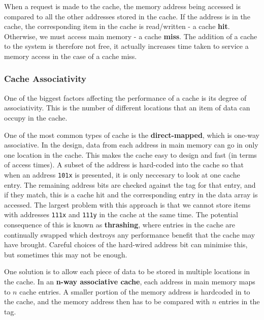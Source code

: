 \documentclass{article}
\begin{document}
	\par 
	When a request is made to the cache, the memory address being accessed is compared to all the other addresses stored in the cache. If the address is in the cache, the corresponding item in the cache is read/written - a cache \textbf{hit}. Otherwise, we must access main memory - a cache \textbf{miss}. The addition of a cache to the system is therefore not free, it actually increases time taken to service a memory access in the case of a cache miss.
	
	\subsubsection{Cache Associativity}
	One of the biggest factors affecting the performance of a cache is its degree of associativity. This is the number of different locations that an item of data can occupy in the cache.
	
	\par
	One of the most common types of cache is the \textbf{direct-mapped}, which is one-way associative. In the design, data from each address in main memory can go in only one location in the cache. This makes the cache easy to design and fast (in terms of access times). A subset of the address is hard-coded into the cache so that when an address \texttt{101x} is presented, it is only neccesary to look at one cache entry. The remaining address bits are checked against the tag for that entry, and if they match, this is a cache hit and the corresponding entry in the data array is accessed. The largest problem with this approach is that we cannot store items with addresses \texttt{111x} and \texttt{111y} in the cache at the same time. The potential consequence of this is known as \textbf{thrashing}, where entries in the cache are continually swapped which destroys any performance benefit that the cache may have brought. Careful choices of the hard-wired address bit can minimise this, but sometimes this may not be enough.
	
	\par 
	One solution is to allow each piece of data to be stored in multiple locations in the cache. In an \textbf{n-way associative cache}, each address in main memory maps to $n$ cache entries. A smaller portion of the memory address is hardcoded in to the cache, and the memory address then has to be compared with $n$ entries in the tag.
	
\end{document}
